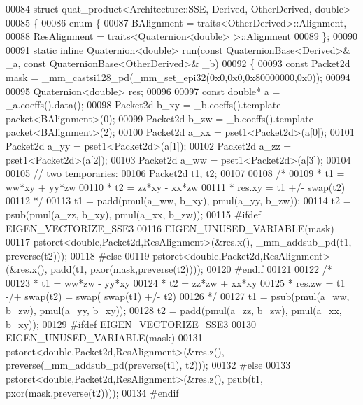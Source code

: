 \begin{DoxyCode}
00084 \textcolor{keyword}{struct }quat\_product<Architecture::SSE, Derived, OtherDerived, double>
00085 \{
00086   \textcolor{keyword}{enum} \{
00087     BAlignment = traits<OtherDerived>::Alignment,
00088     ResAlignment = traits<Quaternion<double> >::Alignment
00089   \};
00090 
00091   \textcolor{keyword}{static} \textcolor{keyword}{inline} Quaternion<double> run(\textcolor{keyword}{const} QuaternionBase<Derived>& \_a, \textcolor{keyword}{const} 
      QuaternionBase<OtherDerived>& \_b)
00092   \{
00093   \textcolor{keyword}{const} Packet2d mask = \_mm\_castsi128\_pd(\_mm\_set\_epi32(0x0,0x0,0x80000000,0x0));
00094 
00095   Quaternion<double> res;
00096 
00097   \textcolor{keyword}{const} \textcolor{keywordtype}{double}* a = \_a.coeffs().data();
00098   Packet2d b\_xy = \_b.coeffs().template packet<BAlignment>(0);
00099   Packet2d b\_zw = \_b.coeffs().template packet<BAlignment>(2);
00100   Packet2d a\_xx = pset1<Packet2d>(a[0]);
00101   Packet2d a\_yy = pset1<Packet2d>(a[1]);
00102   Packet2d a\_zz = pset1<Packet2d>(a[2]);
00103   Packet2d a\_ww = pset1<Packet2d>(a[3]);
00104 
00105   \textcolor{comment}{// two temporaries:}
00106   Packet2d t1, t2;
00107 
00108   \textcolor{comment}{/*}
00109 \textcolor{comment}{   * t1 = ww*xy + yy*zw}
00110 \textcolor{comment}{   * t2 = zz*xy - xx*zw}
00111 \textcolor{comment}{   * res.xy = t1 +/- swap(t2)}
00112 \textcolor{comment}{   */}
00113   t1 = padd(pmul(a\_ww, b\_xy), pmul(a\_yy, b\_zw));
00114   t2 = psub(pmul(a\_zz, b\_xy), pmul(a\_xx, b\_zw));
00115 \textcolor{preprocessor}{#ifdef EIGEN\_VECTORIZE\_SSE3}
00116   EIGEN\_UNUSED\_VARIABLE(mask)
00117   pstoret<double,Packet2d,ResAlignment>(&res.x(), \_mm\_addsub\_pd(t1, preverse(t2)));
00118 \textcolor{preprocessor}{#else}
00119   pstoret<double,Packet2d,ResAlignment>(&res.x(), padd(t1, pxor(mask,preverse(t2))));
00120 \textcolor{preprocessor}{#endif}
00121   
00122   \textcolor{comment}{/*}
00123 \textcolor{comment}{   * t1 = ww*zw - yy*xy}
00124 \textcolor{comment}{   * t2 = zz*zw + xx*xy}
00125 \textcolor{comment}{   * res.zw = t1 -/+ swap(t2) = swap( swap(t1) +/- t2)}
00126 \textcolor{comment}{   */}
00127   t1 = psub(pmul(a\_ww, b\_zw), pmul(a\_yy, b\_xy));
00128   t2 = padd(pmul(a\_zz, b\_zw), pmul(a\_xx, b\_xy));
00129 \textcolor{preprocessor}{#ifdef EIGEN\_VECTORIZE\_SSE3}
00130   EIGEN\_UNUSED\_VARIABLE(mask)
00131   pstoret<double,Packet2d,ResAlignment>(&res.z(), preverse(\_mm\_addsub\_pd(preverse(t1), t2)));
00132 \textcolor{preprocessor}{#else}
00133   pstoret<double,Packet2d,ResAlignment>(&res.z(), psub(t1, pxor(mask,preverse(t2))));
00134 \textcolor{preprocessor}{#endif}

\end{DoxyCode}
